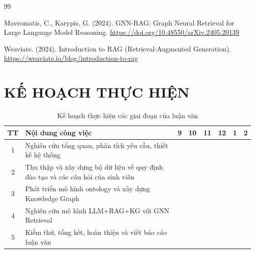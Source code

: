 \documentclass[a4paper,12pt]{article}
\begin{document}
\begin{thebibliography}{99}

Mavromatis, C., Karypis, G. (2024). GNN-RAG: Graph Neural Retrieval for Large Language Model Reasoning. \url{https://doi.org/10.48550/arXiv.2405.20139}


Weaviate. (2024). Introduction to RAG (Retrieval-Augmented Generation). \url{https://weaviate.io/blog/introduction-to-rag}

\end{thebibliography}

\newpage
\section{KẾ HOẠCH THỰC HIỆN}

\begin{table}[h!]
\centering
\renewcommand{\arraystretch}{1.5}
\setlength{\tabcolsep}{6pt}
\begin{tabular}{|c|p{8cm}|*{6}{c|}}
\hline
\textbf{TT} & \textbf{Nội dung công việc} & \textbf{9} & \textbf{10} & \textbf{11} & \textbf{12} & \textbf{1} & \textbf{2} \\
\hline
1 & Nghiên cứu tổng quan, phân tích yêu cầu, thiết kế hệ thống & \cellcolor[HTML]{6CABDD} & & & & & \\
\hline
2 & Thu thập và xây dựng bộ dữ liệu về quy định đào tạo và các câu hỏi của sinh viên & & \cellcolor[HTML]{6CABDD} & & & & \\
\hline
3 & Phát triển mô hình ontology và xây dựng Knowledge Graph & & & \cellcolor[HTML]{6CABDD} & \cellcolor[HTML]{6CABDD} & & \\
\hline
4 & Nghiên cứu mô hình LLM+RAG+KG với GNN Retrieval & & & & & \cellcolor[HTML]{6CABDD} & \\
\hline
5 & Kiểm thử, tổng kết, hoàn thiện và viết báo cáo luận văn & & & & & & \cellcolor[HTML]{6CABDD} \\
\hline
\end{tabular}
\caption{Kế hoạch thực hiện các giai đoạn của luận văn}
\end{table}
\end{document}
